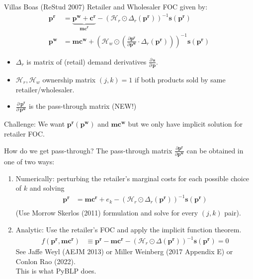 \begin{frame}{Villas Boas (ReStud 2007)}
Retailer and Wholesaler FOC given by:
\begin{align*}
\mathbf{p^r} &= \underbrace{\mathbf{p^w} +\mathbf{c^r}}_{\mathbf{mc^r}} -(\mathcal{H}_r \odot \Delta_{r}(\mathbf{p^r}))^{-1} \mathbf{s}(\mathbf{p^r})\\
\mathbf{p^w}  &= \mathbf{mc^w} + \left(\mathcal{H}_{w} \odot \left( \frac{\partial \mathbf{p^r}}{\partial \mathbf{p^w}} \cdot  \Delta_r(\mathbf{p^r} ) \right) \right)^{-1} \mathbf{s}(\mathbf{p^r})
\end{align*}
\begin{itemize}
  \item $\Delta_r$ is matrix of (retail) demand derivatives $\frac{\partial\, \mathbf{s}}{\partial\, \mathbf{p}}$.
\item $\mathcal{H}_r,\mathcal{H}_w$  ownership matrix $(j,k)=1$ if both products sold by same retailer/wholesaler.
\item $\frac{\partial\, \mathbf{p^r}}{\partial\, \mathbf{p^w}}$ is the \alert{pass-through matrix} (NEW!)
\end{itemize}
Challenge: We want $\mathbf{p^r}(\mathbf{p^w})$ and $\mathbf{mc^w}$ but we only have implicit solution for retailer FOC.
\end{frame}

\begin{frame}{How do we get pass-through?}
The \alert{pass-through matrix} $\frac{\partial \mathbf{p^r}}{\partial \mathbf{p^w}}$ can be obtained in one of two ways:
\begin{enumerate}
\item Numerically: perturbing the retailer's marginal costs for each possible choice of $k$ and solving
\begin{align*}
\mathbf{p^r} &=\mathbf{mc^r} + e_k -(\mathcal{H}_r \odot \Delta_{r}(\mathbf{p^r}))^{-1} \mathbf{s}(\mathbf{p^r})\\
\end{align*}
(Use Morrow Skerlos (2011) formulation and solve for every $(j,k)$ pair).
\item Analytic: Use the retailer's FOC and apply the implicit function theorem.
\begin{align}
\tag{retailer FOC}
 f(\mathbf{p^r},\mathbf{mc^r}) &\equiv \mathbf{p^r}  - \mathbf{mc^r}-  \left(\mathcal{H}_{r} \odot \Delta(\mathbf{p^r}) \right)^{-1} \mathbf{s}(\mathbf{p^r})=0 
\end{align}
See Jaffe Weyl (AEJM 2013) or Miller Weinberg (2017 Appendix E) or Conlon Rao (2022).\\
\alert{This is what PyBLP does}.
  \end{enumerate}

\end{frame}

